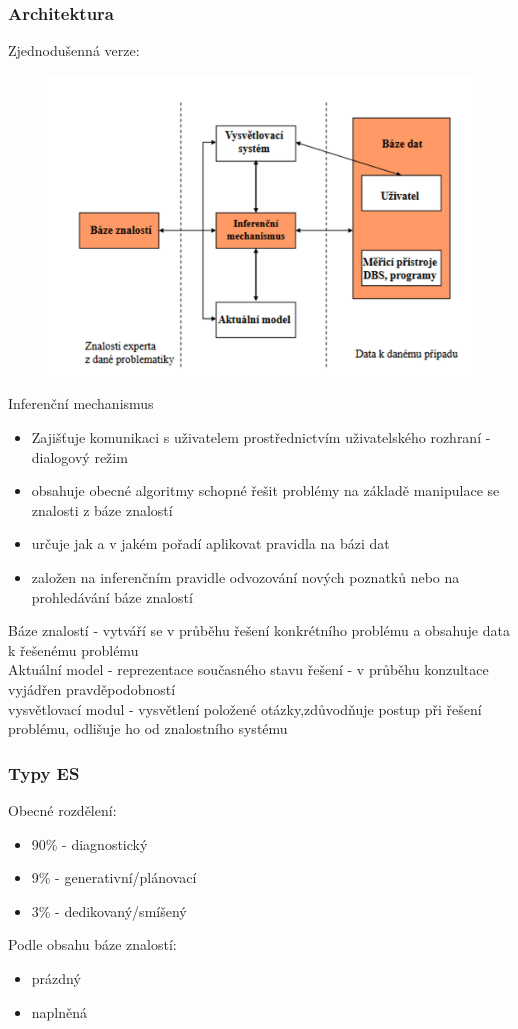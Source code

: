 \subsubsection*{Architektura}
Zjednodušenná verze:
\begin{figure}[H]
    \includegraphics[scale = 0.3]{images/ES_ez.png}    
\end{figure}
Inferenční mechanismus
\begin{itemize}
    \item Zajišťuje komunikaci s uživatelem prostřednictvím uživatelského rozhraní - dialogový režim
    \item obsahuje obecné algoritmy schopné řešit problémy na základě manipulace se znalosti z báze znalostí
    \item určuje jak a v jakém pořadí aplikovat pravidla na bázi dat
    \item založen na inferenčním pravidle odvozování nových poznatků nebo na prohledávání báze znalostí
\end{itemize}
Báze znalostí - vytváří se v průběhu řešení konkrétního problému a obsahuje data k řešenému problému\\
Aktuální model - reprezentace současného stavu řešení - v průběhu konzultace vyjádřen pravděpodobností\\
vysvětlovací modul - vysvětlení položené otázky,zdůvodňuje postup při řešení problému, odlišuje ho od znalostního systému
\newpage
\subsubsection*{Typy ES}
Obecné rozdělení:
\begin{itemize}
    \item 90\% - diagnostický
    \item 9\% - generativní/plánovací
    \item 3\% - dedikovaný/smíšený
\end{itemize}
Podle obsahu báze znalostí:
\begin{itemize}
    \item prázdný
    \item naplněná
\end{itemize}

